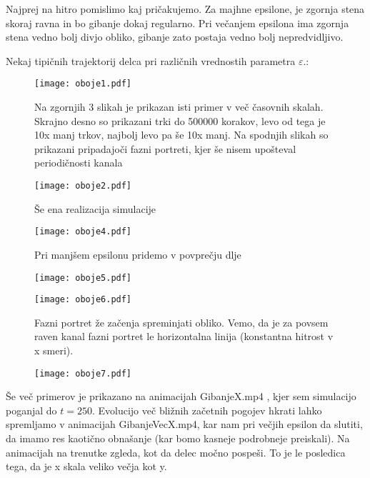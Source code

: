 \documentclass{article}
\begin{document}
Najprej na hitro pomislimo kaj pričakujemo. Za majhne epsilone, je zgornja stena skoraj ravna in bo gibanje dokaj regularno. Pri večanjem epsilona ima zgornja stena vedno bolj divjo obliko, gibanje zato postaja vedno bolj nepredvidljivo.

Nekaj tipičnih trajektorij delca pri različnih vrednostih parametra $\varepsilon$.:

\begin{figure}[H]
\texttt{[image: oboje1.pdf]}
\caption*{Na zgornjih 3 slikah je prikazan isti primer v več časovnih skalah. Skrajno desno so prikazani trki do 500000 korakov, levo od tega je 10x manj trkov, najbolj levo pa še 10x manj. Na spodnjih slikah so prikazani pripadajoči fazni portreti, kjer še nisem upošteval periodičnosti kanala}
\end{figure}

\begin{figure}[H]
\texttt{[image: oboje2.pdf]}
\caption*{Še ena realizacija simulacije}
\end{figure}


\begin{figure}[H]
\texttt{[image: oboje4.pdf]}
\caption*{Pri manjšem epsilonu pridemo v povprečju dlje}
\end{figure}

\begin{figure}[H]
\texttt{[image: oboje5.pdf]}
\caption*{}
\end{figure}

\begin{figure}[H]
\texttt{[image: oboje6.pdf]}
\caption*{Fazni portret že začenja spreminjati obliko. Vemo, da je za povsem raven kanal fazni portret le horizontalna linija (konstantna hitrost v x smeri).}
\end{figure}

\begin{figure}[H]
\texttt{[image: oboje7.pdf]}
\caption*{}
\end{figure}

Še več primerov je prikazano na animacijah GibanjeX.mp4 , kjer sem simulacijo poganjal do $t=250$. Evolucijo več bližnih začetnih pogojev hkrati  lahko spremljamo v animacijah GibanjeVecX.mp4, kar nam pri večjih epsilon da slutiti, da imamo res kaotično obnašanje (kar bomo kasneje podrobneje preiskali).
Na animacijah na trenutke zgleda, kot da delec močno pospeši. To je le posledica tega, da je x skala veliko večja kot y.
\end{document}
